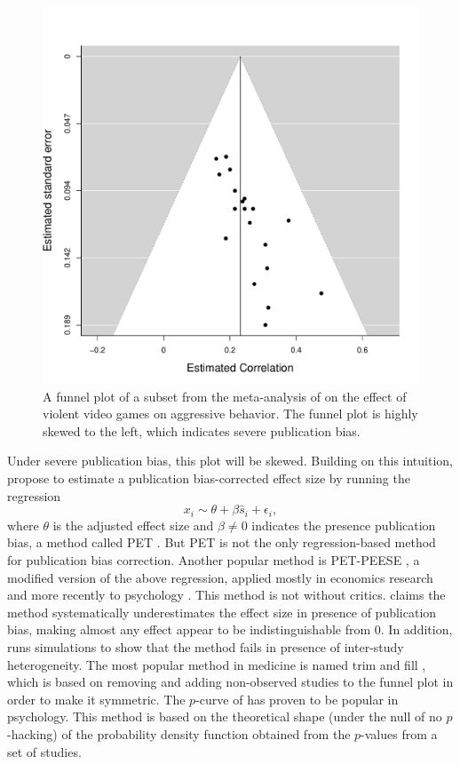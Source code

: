 \begin{figure}
\noindent \begin{centering}
\includegraphics[scale=0.5]{chunks/anderson}
\par\end{centering}
\caption{\label{fig:A-funnel-plot}A funnel plot of a subset from the meta-analysis of \textcite{Anderson2010-ki} on the effect of violent video games on aggressive behavior. The funnel plot is highly skewed to the left, which indicates severe publication bias.}
\end{figure}

Under severe publication bias, this plot will be skewed. Building on this intuition, \textcite{Egger1998-kj} propose to estimate a publication bias-corrected effect size by running the regression
\[
x_{i}\sim\theta+\beta\widehat{s}_{i}+\epsilon_{i},
\]
where $\theta$ is the adjusted effect size and $\beta\neq0$ indicates the presence publication bias, a method called PET \parencite{stanley_beyond_2005}. But PET is not the only regression-based method for publication bias
correction. Another popular method is PET-PEESE \parencite{Stanley2014-gx}, a modified version of the above regression, applied mostly in economics research and more recently to psychology \parencite{carter_series_2015}. This method is not without critics. \textcite{gervais_putting_2015} claims the method systematically underestimates the effect size in presence of publication bias, making almost any effect appear to be indistinguishable from $0$. In addition, \textcite{simonsohn_[59]_2017} runs simulations to show that the method fails in presence of inter-study heterogeneity. The most popular method in medicine is named trim and fill \parencite{Duval2000-ct}, which is based on removing and adding non-observed studies to the funnel plot in order to make it symmetric. The $p$-curve of \textcite{simonsohn_p-curve:_2014} has proven to be popular in psychology. This method is based on the theoretical shape (under the null of no $p$-hacking) of the probability density function obtained from the $p$-values from a set of studies.

